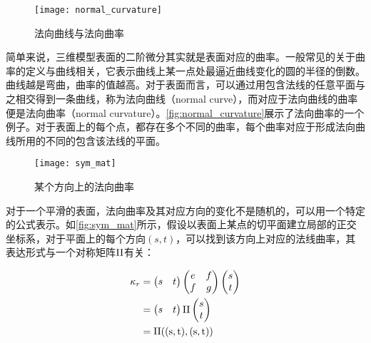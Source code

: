 \begin{figure}[tbh]
    \centering
    \texttt{[image: normal\_curvature]}
    \caption{\label{fig:normal_curvature}
    法向曲线与法向曲率}
\end{figure}

简单来说，三维模型表面的二阶微分其实就是表面对应的曲率。一般常见的关于曲率的定义与曲线相关，它表示曲线上某一点处最逼近曲线变化的圆的半径的倒数。曲线越是弯曲，曲率的值越高。对于表面而言，可以通过用包含法线的任意平面与之相交得到一条曲线，称为法向曲线（normal curve），而对应于法向曲线的曲率便是法向曲率（normal curvature）。\autoref{fig:normal_curvature}\cite{rusinkiewicz2008line}展示了法向曲率的一个例子。对于表面上的每个点，都存在多个不同的曲率，每个曲率对应于形成法向曲线所用的不同的包含该法线的平面。

\begin{figure}[tbh]
    \centering
    \texttt{[image: sym\_mat]}
    \caption{\label{fig:sym_mat}
    某个方向上的法向曲率}
\end{figure}

对于一个平滑的表面，法向曲率及其对应方向的变化不是随机的，可以用一个特定的公式表示。如\autoref{fig:sym_mat}所示，\cite{rusinkiewicz2008line}假设以表面上某点的切平面建立局部的正交坐标系，对于平面上的每个方向$(s,t)$，可以找到该方向上对应的法线曲率，其表达形式与一个对称矩阵$\rm II$有关：

\begin{equation}
    \begin{split}
        \kappa_r &= 
        \begin{pmatrix}
            s & t
        \end{pmatrix}
        \begin{pmatrix}
            e & f \\
            f & g
        \end{pmatrix}
        \begin{pmatrix}
            s \\
            t
        \end{pmatrix} \\
        &= 
        \begin{pmatrix}
            s & t
        \end{pmatrix}
        \rm II
        \begin{pmatrix}
            s \\
            t
        \end{pmatrix} \\
        &= 
        \rm II((s, t), (s, t))
    \end{split}
\end{equation}

